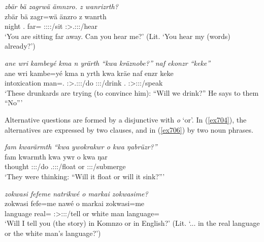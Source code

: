 \begin{exe}
	\ex \emph{zbär bä zagrwä ämnzro. z wanrizrth?}\\
	\gll zbär bä zagr=wä änzro z wanrth\\
	night \Second.\Abs{} far=\Emph{} \Stpl:\Sbj:\Nonpast:\Ipfv:\Andat/sit \Iam{} \Stpl:\Sbj>\Fsg.\Io:\Nonpast:\Ipfv:\Venit/hear\\
	\trans `You are sitting far away. Can you hear me?' (Lit. `You hear my (words) already?')
	\label{ex702}
\end{exe}
\begin{exe}
	\ex \emph{ane wri kambeyé kma n yrärth ``kwa kräznobe?'' naf ekonzr ``keke''}\\
	\gll ane wri kambe=yé kma n yrth kwa kräe naf enzr keke\\
	\Dem{} intoxication man=\Erg.\Nsg{} \Pot{} \Imn{} \Stpl:\Sbj>\Tsg.\Masc:\Obj:\Nonpast:\Ipfv/do \Fut{} \Fpl:\Sbj:\Irr:\Pfv/drink \Tsg.\Erg{} \Stsg:\Sbj>\Stpl:\Obj:\Nonpast:\Ipfv/speak \Neg\\
	\trans `These drunkards are trying (to convince him): ``Will we drink?'' He says to them ``No'''
	\label{ex703}
\end{exe}

Alternative questions are formed by a disjunctive  with \emph{o} `or'. In (\ref{ex704}), the alternatives are expressed by two clauses, and in (\ref{ex706}) by two noun phrases.

\begin{exe}
	\ex \emph{fam kwarärmth ``kwa ywokrakwr o kwa ŋabrüzr?''}\\
	\gll fam kwarmth kwa ywr o kwa ŋar\\
	thought \Stpl:\Sbj:\Pst:\Dur/do \Fut{} \Tsg.\Masc:\Sbj:\Nonpast:\Ipfv/float or \Fut{} \Stsg:\Sbj:\Nonpast:\Ipfv/submerge\\
	\trans `They were thinking: ``Will it float or will it sink?'''
	\label{ex704}
\end{exe}
\begin{exe}
	\ex \emph{zokwasi fefeme natrikwé o markai zokwasime?}\\
	\gll zokwasi fefe=me nawé o markai zokwasi=me\\
	language real=\Ins{} \Fsg:\Sbj>\Ssg:\Io:\Nonpast:\Ipfv/tell or {white man} language=\Ins\\
	\trans `Will I tell you (the story) in Komnzo or in English?' (Lit. `... in the real language or the white man's language?')
	\label{ex706}
\end{exe}

